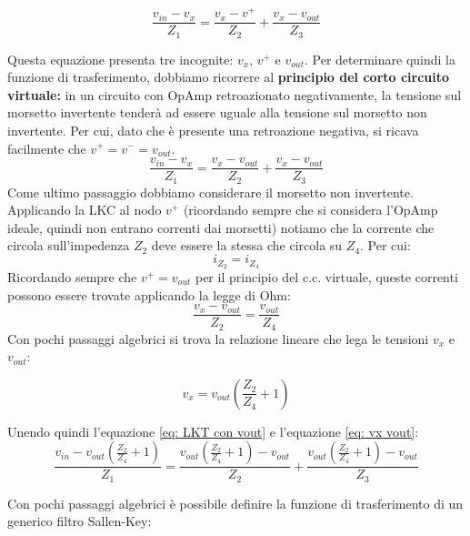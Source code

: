 \begin{equation}
    \frac{v_{in} - v_x}{Z_1} = \frac{v_x-v^+}{Z_2} + \frac{v_x - v_{out}}{Z_3}
    \label{eq: LKT completo}
\end{equation}

Questa equazione presenta tre incognite: $v_x,\, v^+$ e $v_{out}$. Per determinare quindi la funzione di trasferimento, dobbiamo ricorrere al \textbf{principio del corto circuito virtuale:} in un circuito con OpAmp retroazionato negativamente, la tensione sul morsetto invertente tenderà ad essere uguale alla tensione sul morsetto non invertente. 
Per cui, dato che è presente una retroazione negativa, si ricava facilmente che \(v^+ = v^- =v_{out}\).
\begin{equation}
        \frac{v_{in} - v_x}{Z_1} = \frac{v_x-v_{out}}{Z_2} + \frac{v_x - v_{out}}{Z_3}
        \label{eq: LKT con vout}
\end{equation}
Come ultimo passaggio dobbiamo considerare il morsetto non invertente. Applicando la LKC al nodo $v^+$ (ricordando sempre che si considera l'OpAmp ideale, quindi non entrano correnti dai morsetti) notiamo che la corrente che circola sull'impedenza $Z_2$ deve essere la stessa che circola su $Z_4$. Per cui:
\begin{equation}
    i_{Z_2} = i_{Z_4} 
    \label{eq: iz2 iz4}
\end{equation}
Ricordando sempre che $v^+ = v_{out}$ per il principio del c.c. virtuale, queste correnti possono essere trovate applicando la legge di Ohm:
\begin{equation}
    \frac{v_x-v_{out}}{Z_2} = \frac{v_{out}}{Z_4}
    \label{eq: Ohm Z2 Z4}
\end{equation}
Con pochi passaggi algebrici si trova la relazione lineare che lega le tensioni $v_x$ e $v_{out}$:

\begin{equation}
v_x = v_{out}\left(\frac{Z_2}{Z_4}+1\right)
\label{eq: vx vout}  
\end{equation}

Unendo quindi l'equazione \ref{eq: LKT con vout} e l'equazione \ref{eq: vx vout}:
\begin{equation}
    \frac{v_{in} - v_{out}\left(\frac{Z_2}{Z_4}+1\right) }{Z_1} = \frac{v_{out}\left(\frac{Z_2}{Z_4}+1\right) -v_{out}}{Z_2} + \frac{v_{out}\left(\frac{Z_2}{Z_4}+1\right)  - v_{out}}{Z_3}
    \label{eq: LKT vin vout}
\end{equation}

Con pochi passaggi algebrici è possibile definire la funzione di trasferimento di un generico filtro Sallen-Key:

